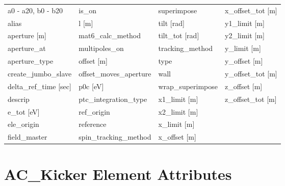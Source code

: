  \begin{tabular}{llll} \toprule
a0 - a20, b0 - b20               & is_on                            & superimpose                      & x_offset_tot [m]                 \\
alias                            & l [m]                            & tilt [rad]                       & y1_limit [m]                     \\
aperture [m]                     & mat6_calc_method                 & tilt_tot [rad]                   & y2_limit [m]                     \\
aperture_at                      & multipoles_on                    & tracking_method                  & y_limit [m]                      \\
aperture_type                    & offset [m]                       & type                             & y_offset [m]                     \\
create_jumbo_slave               & offset_moves_aperture            & wall                             & y_offset_tot [m]                 \\
delta_ref_time [sec]             & p0c [eV]                         & wrap_superimpose                 & z_offset [m]                     \\
descrip                          & ptc_integration_type             & x1_limit [m]                     & z_offset_tot [m]                 \\
e_tot [eV]                       & ref_origin                       & x2_limit [m]                     &                                  \\
ele_origin                       & reference                        & x_limit [m]                      &                                  \\
field_master                     & spin_tracking_method             & x_offset [m]                     &                                  \\
 \bottomrule
 \end{tabular}
 \vfill
 
 \section{AC_Kicker Element Attributes}
 \label{s:list.ac.kicker}
 
